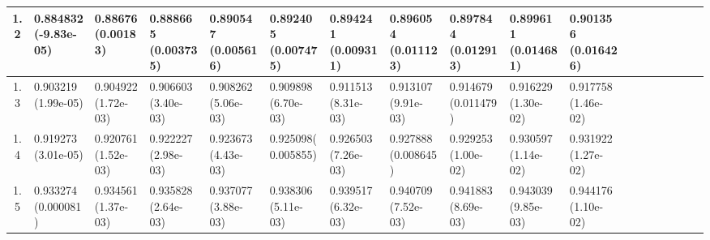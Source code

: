 \documentclass[
	article,			%
	12pt,				%
	twoside,			%
	a4paper,			%
	english,			%
	brazil,				%
	]{abntex2}
\begin{document}
\begin{landscape}
\begin{table}
\begin{tabular}{c||p{17mm}|p{17mm}|p{17mm}|p{17mm}|p{17mm}|p{17mm}|p{17mm}|p{17mm}|p{17mm}|p{17mm}|p{17mm}|p{17mm}|p{17mm}|p{17mm}|p{17mm}|p{17mm}|p{17mm}}
    			1.2&0.884832 \newline(-9.83e-05)&0.88676 \newline(0.00183)&0.888665 \newline(0.003735)&0.890547 \newline(0.005616)&
0.892405 \newline(0.007475)&
0.894241 \newline(0.009311)&
0.896054 \newline(0.011123)&0.897844 \newline(0.012913)&0.899611 \newline(0.014681)&0.901356 \newline(0.016426)\\
\hline
    			1.3 & 0.903219 \newline(1.99e-05)&0.904922 \newline(1.72e-03)&0.906603 \newline(3.40e-03)&0.908262 \newline(5.06e-03)&0.909898 \newline(6.70e-03)&0.911513 \newline(8.31e-03)&0.913107 \newline(9.91e-03)&0.914679 \newline(0.011479)&0.916229 \newline(1.30e-02)&0.917758 \newline(1.46e-02)\\
    			\hline
    			1.4 & 0.919273 \newline(3.01e-05)&0.920761 \newline(1.52e-03)&0.922227 \newline(2.98e-03)&0.923673 \newline(4.43e-03)& 0.925098\newline(0.005855)&0.926503 \newline(7.26e-03)&0.927888 \newline(0.008645)&0.929253 \newline(1.00e-02)&0.930597 \newline(1.14e-02)&0.931922 \newline(1.27e-02)\\
    			\hline
    			1.5 & 0.933274 \newline(0.000081)&0.934561 \newline(1.37e-03)&0.935828 \newline(2.64e-03)&0.937077 \newline(3.88e-03)&0.938306 \newline(5.11e-03)&0.939517 \newline(6.32e-03)&0.940709 \newline(7.52e-03)&0.941883 \newline(8.69e-03)&0.943039 \newline(9.85e-03)&0.944176 \newline(1.10e-02)\\

\end{tabular}
\end{table}
\end{landscape}
\end{document}
